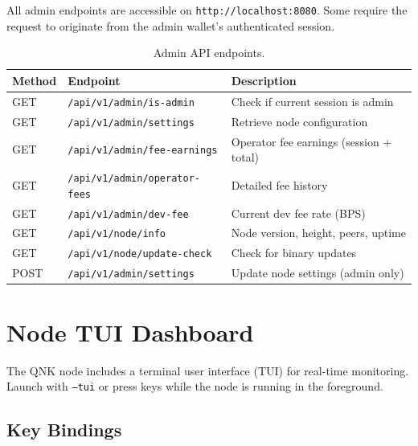 \documentclass[11pt,a4paper]{article}
\begin{document}
All admin endpoints are accessible on \texttt{http://localhost:8080}. Some
require the request to originate from the admin wallet's authenticated session.

\begin{table}[H]
\centering
\small
\begin{tabular}{@{}llp{5.5cm}@{}}
\toprule
\textbf{Method} & \textbf{Endpoint} & \textbf{Description} \\
\midrule
GET  & \texttt{/api/v1/admin/is-admin}       & Check if current session is admin \\
GET  & \texttt{/api/v1/admin/settings}        & Retrieve node configuration \\
GET  & \texttt{/api/v1/admin/fee-earnings}    & Operator fee earnings (session + total) \\
GET  & \texttt{/api/v1/admin/operator-fees}   & Detailed fee history \\
GET  & \texttt{/api/v1/admin/dev-fee}         & Current dev fee rate (BPS) \\
GET  & \texttt{/api/v1/node/info}             & Node version, height, peers, uptime \\
GET  & \texttt{/api/v1/node/update-check}     & Check for binary updates \\
POST & \texttt{/api/v1/admin/settings}        & Update node settings (admin only) \\
\bottomrule
\end{tabular}
\caption{Admin API endpoints.}
\end{table}

\section{Node TUI Dashboard}

The QNK node includes a terminal user interface (TUI) for real-time monitoring.
Launch with \texttt{--tui} or press keys while the node is running in the foreground.

\subsection{Key Bindings}
\end{document}
